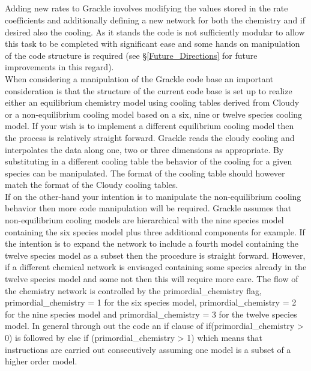 \subsection{}

Adding new rates to Grackle involves modifying the values stored in the rate coefficients and 
additionally defining a new network for both the chemistry and if desired also the cooling. As it stands the
code is not sufficiently modular to allow this task to be completed with significant ease and some
hands on manipulation of the code structure is required (see \S \ref{Future_Directions} for 
future improvements in this regard). \\
\indent When considering a manipulation of the Grackle code base an important consideration is that the structure
of the current code base is set up to realize either an equilibrium chemistry model using cooling tables
derived from Cloudy or a non-equilibrium cooling model based on a six, nine or twelve species cooling model. 
If your wish is to implement a different equilibrium cooling model then the process is relatively straight
forward. Grackle reads the cloudy cooling and interpolates the data along one, two or three dimensions as
appropriate. By substituting in a different cooling table the behavior of the cooling for a given species
can be manipulated. The format of the cooling table should however match the format of the Cloudy cooling
tables. \\
\indent If on the other-hand your intention is to manipulate the non-equilibrium cooling behavior then more
code manipulation will be required. Grackle assumes that non-equilibrium cooling models are hierarchical
with the nine species model containing the six species model plus three additional components for example. 
If the intention is to expand the network to include a fourth model containing the twelve species model as 
a subset then the procedure is straight forward. However, if a different chemical network is envisaged 
containing some species already in the twelve species model and some not then this will require more care. 
The flow of the chemistry network is controlled by the primordial\_chemistry flag, 
primordial\_chemistry = 1 for the six species model, primordial\_chemistry = 2 for the nine species model and
primordial\_chemistry = 3 for the twelve species model. In general through out the code an if clause of 
if(primordial\_chemistry > 0) is followed by else if (primordial\_chemistry > 1) which means that instructions
are carried out consecutively assuming one model is a subset of a higher order model.
